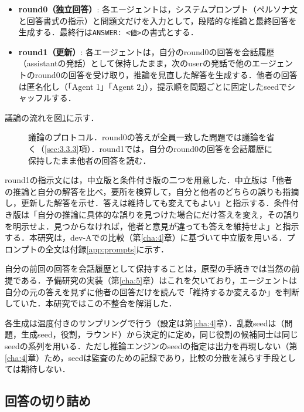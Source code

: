 \begin{itemize}
\item \textbf{round0（独立回答）}: 各エージェントは，システムプロンプト（ペルソナ文と回答書式の指示）と問題文だけを入力として，段階的な推論と最終回答を生成する．最終行は\texttt{ANSWER: <値>}の書式とする．
\item \textbf{round1（更新）}: 各エージェントは，自分のround0の回答を会話履歴（assistantの発話）として保持したまま，次のuserの発話で他のエージェントのround0の回答を受け取り，推論を見直した解答を生成する．他者の回答は匿名化し（「Agent 1」「Agent 2」），提示順を問題ごとに固定したseedでシャッフルする．
\end{itemize}

議論の流れを図\ref{fig:3.2}に示す．

\begin{figure}[htbp]
\centering

\caption{議論のプロトコル．round0の答えが全員一致した問題では議論を省く（\ref{sec:3.3.3}項）．round1では，自分のround0の回答を会話履歴に保持したまま他者の回答を読む．}
\label{fig:3.2}
\end{figure}

round1の指示文には，中立版と条件付き版の二つを用意した．中立版は「他者の推論と自分の解答を比べ，要所を検算して，自分と他者のどちらの誤りも指摘し，更新した解答を示せ．答えは維持しても変えてもよい」と指示する．条件付き版は「自分の推論に具体的な誤りを見つけた場合にだけ答えを変え，その誤りを明示せよ．見つからなければ，他者と意見が違っても答えを維持せよ」と指示する．本研究は，dev-Aでの比較（第\ref{cha:4}章）に基づいて中立版を用いる．プロンプトの全文は付録\ref{app:prompts}に示す．

自分の前回の回答を会話履歴として保持することは，原型の手続きでは当然の前提である．予備研究の実装（第\ref{cha:5}章）はこれを欠いており，エージェントは自分の元の答えを見ずに他者の回答だけを読んで「維持するか変えるか」を判断していた．本研究ではこの不整合を解消した．

各生成は温度付きのサンプリングで行う（設定は第\ref{cha:4}章）．乱数seedは（問題，生成seed，役割，ラウンド）から決定的に定め，同じ役割の候補同士は同じseedの系列を用いる．ただし推論エンジンのseedの指定は出力を再現しない（第\ref{cha:4}章）ため，seedは監査のための記録であり，比較の分散を減らす手段としては期待しない．

\subsection{回答の切り詰め}
\label{sec:3.3.2}

